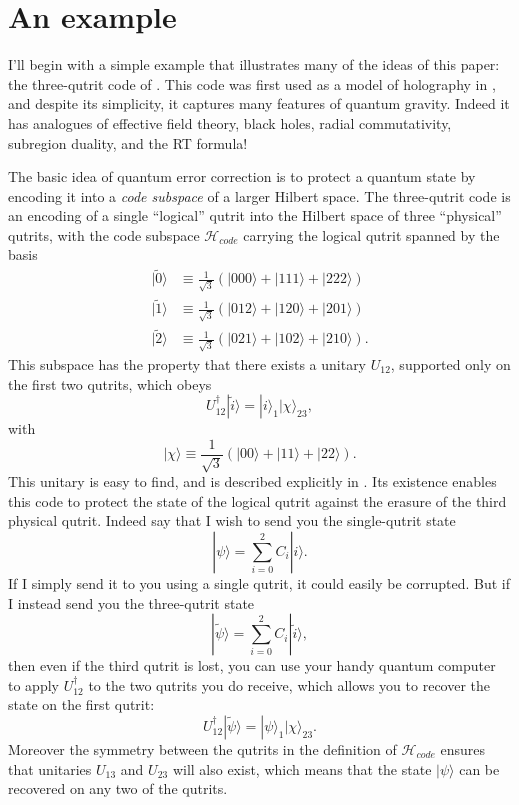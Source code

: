 \documentclass[12pt]{article}
\newcommand{\be}{\begin{equation}}
\newcommand{\ee}{\end{equation}}
\newcommand{\ran}{\rangle}
\newcommand{\wt}{\widetilde}
\newcommand{\Hh}{\mathcal{H}}
\newcommand{\Hc}{\mathcal{H}_{code}}
\begin{document}
\section{An example}\label{exsec}
I'll begin with a simple example that illustrates many of the ideas of this paper: the three-qutrit code of \cite{Cleve:1999qg}.  This code was first used as a model of holography in \cite{Almheiri:2014lwa}, and despite its simplicity, it captures many features of quantum gravity. Indeed it has analogues of effective field theory, black holes, radial commutativity, subregion duality, and the RT formula!

The basic idea of quantum error correction is to protect a quantum state by encoding it into a \textit{code subspace} of a larger Hilbert space. The three-qutrit code is an encoding of a single ``logical'' qutrit into the Hilbert space of three ``physical'' qutrits, with the code subspace $\Hh_{code}$ carrying the logical qutrit spanned by the basis
\begin{align}\nonumber
|\wt{0}\ran&\equiv \frac{1}{\sqrt{3}}\left(|000\ran+|111\ran+|222\ran\right)\\\nonumber
|\wt{1}\ran&\equiv \frac{1}{\sqrt{3}}\left(|012\ran+|120\ran+|201\ran\right)\\\nonumber
|\wt{2}\ran&\equiv \frac{1}{\sqrt{3}}\left(|021\ran+|102\ran+|210\ran\right).\label{3qutrit}
\end{align}
This subspace has the property that there exists a unitary $U_{12}$, supported only on the first two qutrits, which obeys
\be\label{3decode}
U_{12}^\dagger|\wt{i}\ran=|i\ran_1 |\chi\ran_{23},
\ee
with 
\be
|\chi\ran\equiv \frac{1}{\sqrt{3}}\left(|00\ran+|11\ran+|22\ran\right).
\ee
This unitary is easy to find, and is described explicitly in \cite{Almheiri:2014lwa}.  Its existence enables this code to protect the state of the logical qutrit against the erasure of the third physical qutrit.  Indeed say that I wish to send you the single-qutrit state
\be
|\psi\ran=\sum_{i=0}^2 C_i |i\ran.
\ee
If I simply send it to you using a single qutrit, it could easily be corrupted.  But if I instead send you the three-qutrit state
\be
|\wt{\psi}\ran=\sum_{i=0}^2 C_i |\wt{i}\ran,
\ee
then even if the third qutrit is lost, you can use your handy quantum computer to apply $U_{12}^\dagger$ to the two qutrits you do receive, which allows you to recover the state on the first qutrit:
\be
U_{12}^\dagger|\wt{\psi}\ran=|\psi\ran_1|\chi\ran_{23}.
\ee
Moreover the symmetry between the qutrits in the definition of $\Hc$ ensures that unitaries $U_{13}$ and $U_{23}$ will also exist, which means that the state $|\psi\ran$ can be recovered on any two of the qutrits.  
\end{document}
